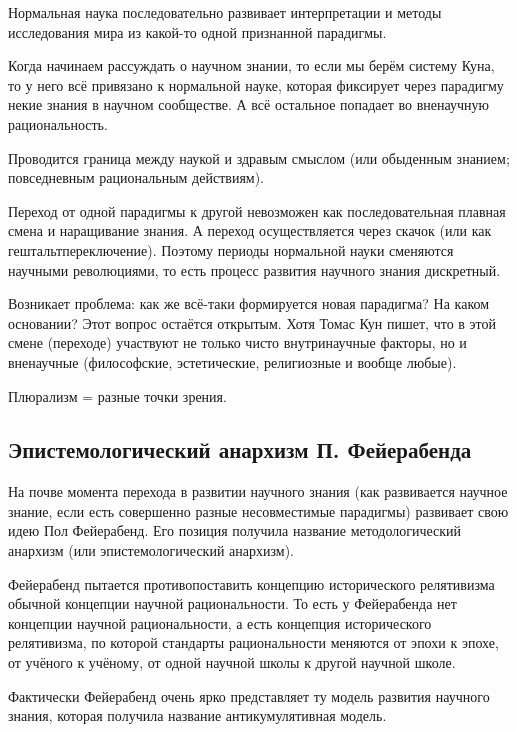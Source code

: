 \documentclass[main.tex]{subfiles}
\begin{document}
Нормальная наука последовательно развивает интерпретации и методы исследования мира из какой-то одной признанной парадигмы.

Когда начинаем рассуждать о научном знании, то если мы берём систему Куна, то у него всё привязано к нормальной науке, которая фиксирует через парадигму некие знания в научном сообществе.
А всё остальное попадает во вненаучную рациональность.

Проводится граница между наукой и здравым смыслом (или обыденным знанием; повседневным рациональным действиям).

Переход от одной парадигмы к другой невозможен как последовательная плавная смена и наращивание знания.
А переход осуществляется через скачок (или как гештальтпереключение).
Поэтому периоды нормальной науки сменяются научными революциями, то есть процесс развития научного знания дискретный.


Возникает проблема: как же всё-таки формируется новая парадигма? На каком основании?
Этот вопрос остаётся открытым.
Хотя Томас Кун пишет, что в этой смене (переходе) участвуют не только чисто внутринаучные факторы, но и вненаучные (философские, эстетические, религиозные и вообще любые).

Плюрализм = разные точки зрения.

\subsection{Эпистемологический анархизм П. Фейерабенда}


На почве момента перехода в развитии научного знания (как развивается научное знание, если есть совершенно разные несовместимые парадигмы) развивает свою идею Пол Фейерабенд.
Его позиция получила название методологический анархизм (или эпистемологический анархизм).

Фейерабенд пытается противопоставить концепцию исторического релятивизма обычной концепции научной рациональности.
То есть у Фейерабенда нет концепции научной рациональности, а есть концепция исторического релятивизма, по которой стандарты рациональности меняются от эпохи к эпохе, от учёного к учёному, от одной научной школы к другой научной школе.

Фактически Фейерабенд очень ярко представляет ту модель развития научного знания, которая получила название антикумулятивная модель.
\end{document}
